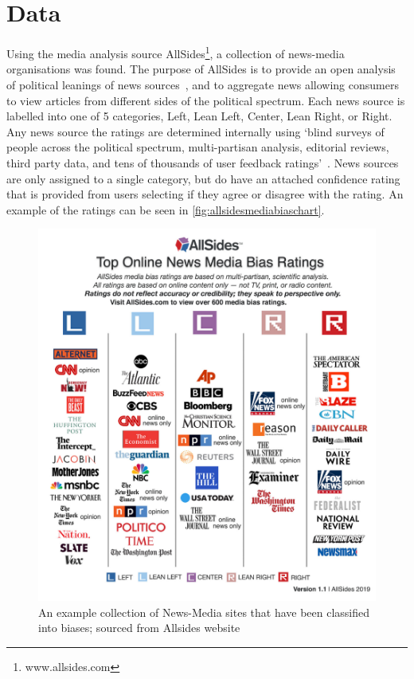 \section{Data}

Using the media analysis source AllSides\footnote{www.allsides.com}, a collection of news-media organisations was found. The purpose of AllSides is to provide an open  analysis of political leanings of news sources~\cite{gable_media_2019}, and to aggregate news allowing consumers to view articles from different sides of the political spectrum. Each news source is labelled into one of 5 categories, {\color{Left}Left},
{\color{LeanLeft}Lean Left},
{\color{Center}Center},
{\color{LeanRight}Lean Right}, or
{\color{Right}Right}.
Any news source the ratings are determined internally using `blind surveys of people across the political spectrum, multi-partisan analysis, editorial reviews, third party data, and tens of thousands of user feedback ratings'~\cite{gable_media_2019}. News sources are only assigned to a single category, but do have an attached confidence rating that is provided from users selecting if they agree or disagree with the rating. An example of the ratings can be seen in \autoref{fig:allsidesmediabiaschart}.

\begin{figure}
	\centering
	\includegraphics[width=0.9\linewidth]{chapter1/figs/AllSidesMediaBiasChart}
	\caption{An example collection of News-Media sites that have been classified into biases; sourced from Allsides website~\cite{gable_media_2019}}
	\label{fig:allsidesmediabiaschart}
\end{figure}



